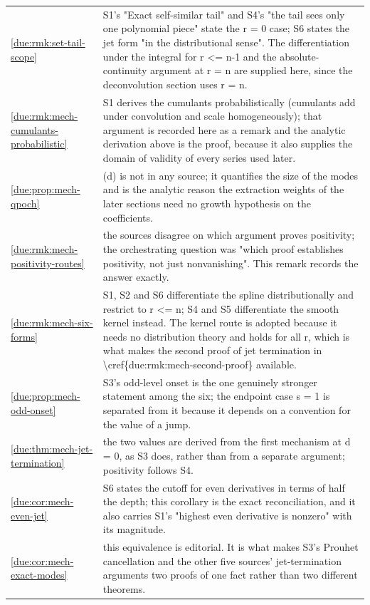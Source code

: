 \documentclass[11pt,oneside]{article}
\theoremstyle{plain}
\theoremstyle{definition}
\theoremstyle{remark}
\begin{document}
\begin{longtable}{@{}p{} p{}@{}}
\cref{due:rmk:set-tail-scope} & S1's "Exact self-similar tail" and S4's "the tail sees only one polynomial piece" state the r = 0 case; S6 states the jet form "in the distributional sense". The differentiation under the integral for r <= n-1 and the absolute-continuity argument at r = n are supplied here, since the deconvolution section uses r = n.\\
\cref{due:rmk:mech-cumulants-probabilistic} & S1 derives the cumulants probabilistically (cumulants add under convolution and scale homogeneously); that argument is recorded here as a remark and the analytic derivation above is the proof, because it also supplies the domain of validity of every series used later.\\
\cref{due:prop:mech-qpoch} & (d) is not in any source; it quantifies the size of the modes and is the analytic reason the extraction weights of the later sections need no growth hypothesis on the coefficients.\\
\cref{due:rmk:mech-positivity-routes} & the sources disagree on which argument proves positivity; the orchestrating question was "which proof establishes positivity, not just nonvanishing". This remark records the answer exactly.\\
\cref{due:rmk:mech-six-forms} & S1, S2 and S6 differentiate the spline distributionally and restrict to r <= n; S4 and S5 differentiate the smooth kernel instead. The kernel route is adopted because it needs no distribution theory and holds for all r, which is what makes the second proof of jet termination in \textbackslash cref\{due:rmk:mech-second-proof\} available.\\
\cref{due:prop:mech-odd-onset} & S3's odd-level onset is the one genuinely stronger statement among the six; the endpoint case s = 1 is separated from it because it depends on a convention for the value of a jump.\\
\cref{due:thm:mech-jet-termination} & the two values are derived from the first mechanism at d = 0, as S3 does, rather than from a separate argument; positivity follows S4.\\
\cref{due:cor:mech-even-jet} & S6 states the cutoff for even derivatives in terms of half the depth; this corollary is the exact reconciliation, and it also carries S1's "highest even derivative is nonzero" with its magnitude.\\
\cref{due:cor:mech-exact-modes} & this equivalence is editorial. It is what makes S3's Prouhet cancellation and the other five sources' jet-termination arguments two proofs of one fact rather than two different theorems.\\

\end{longtable}
\end{document}
